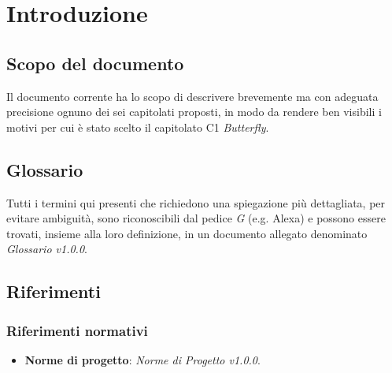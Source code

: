 \section{Introduzione} \label{introduzione}
    \subsection{Scopo del documento}
    Il documento corrente ha lo scopo di descrivere brevemente ma con adeguata precisione ognuno dei sei capitolati proposti,
    in modo da rendere ben visibili i motivi per cui è stato scelto il capitolato C1 \textit{Butterfly}.

    \subsection{Glossario}
    Tutti i termini qui presenti che richiedono una spiegazione più dettagliata, per evitare ambiguit\`a,
    sono riconoscibili dal pedice \textit{G} (e.g. Alexa\GAlt)
    e possono essere trovati, insieme alla loro definizione, in un documento allegato denominato \textit{Glossario v1.0.0}.

    \subsection{Riferimenti}
    	
        \subsubsection{Riferimenti normativi}
	        \begin{itemize}
	        	\item \textbf{Norme di progetto}: \textit{Norme di Progetto v1.0.0}.
	        \end{itemize}

